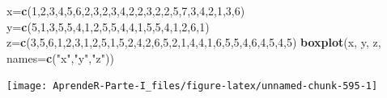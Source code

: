 \documentclass[]{book}
\newenvironment{Shaded}{\begin{snugshade}}{\end{snugshade}}
\newcommand{\DataTypeTok}[1]{\textcolor[rgb]{0.13,0.29,0.53}{#1}}
\newcommand{\DecValTok}[1]{\textcolor[rgb]{0.00,0.00,0.81}{#1}}
\newcommand{\KeywordTok}[1]{\textcolor[rgb]{0.13,0.29,0.53}{\textbf{#1}}}
\newcommand{\NormalTok}[1]{#1}
\newcommand{\StringTok}[1]{\textcolor[rgb]{0.31,0.60,0.02}{#1}}
\theoremstyle{definition}
\theoremstyle{definition}
\theoremstyle{definition}
\theoremstyle{remark}
\begin{document}
\begin{Shaded}
\begin{Highlighting}[]
\NormalTok{x=}\KeywordTok{c}\NormalTok{(}\DecValTok{1}\NormalTok{,}\DecValTok{2}\NormalTok{,}\DecValTok{3}\NormalTok{,}\DecValTok{4}\NormalTok{,}\DecValTok{5}\NormalTok{,}\DecValTok{6}\NormalTok{,}\DecValTok{2}\NormalTok{,}\DecValTok{3}\NormalTok{,}\DecValTok{2}\NormalTok{,}\DecValTok{3}\NormalTok{,}\DecValTok{4}\NormalTok{,}\DecValTok{2}\NormalTok{,}\DecValTok{2}\NormalTok{,}\DecValTok{3}\NormalTok{,}\DecValTok{2}\NormalTok{,}\DecValTok{2}\NormalTok{,}\DecValTok{5}\NormalTok{,}\DecValTok{7}\NormalTok{,}\DecValTok{3}\NormalTok{,}\DecValTok{4}\NormalTok{,}\DecValTok{2}\NormalTok{,}\DecValTok{1}\NormalTok{,}\DecValTok{3}\NormalTok{,}\DecValTok{6}\NormalTok{)}
\NormalTok{y=}\KeywordTok{c}\NormalTok{(}\DecValTok{5}\NormalTok{,}\DecValTok{1}\NormalTok{,}\DecValTok{3}\NormalTok{,}\DecValTok{5}\NormalTok{,}\DecValTok{5}\NormalTok{,}\DecValTok{4}\NormalTok{,}\DecValTok{1}\NormalTok{,}\DecValTok{2}\NormalTok{,}\DecValTok{5}\NormalTok{,}\DecValTok{5}\NormalTok{,}\DecValTok{4}\NormalTok{,}\DecValTok{4}\NormalTok{,}\DecValTok{1}\NormalTok{,}\DecValTok{5}\NormalTok{,}\DecValTok{5}\NormalTok{,}\DecValTok{4}\NormalTok{,}\DecValTok{1}\NormalTok{,}\DecValTok{2}\NormalTok{,}\DecValTok{6}\NormalTok{,}\DecValTok{1}\NormalTok{)}
\NormalTok{z=}\KeywordTok{c}\NormalTok{(}\DecValTok{3}\NormalTok{,}\DecValTok{5}\NormalTok{,}\DecValTok{6}\NormalTok{,}\DecValTok{1}\NormalTok{,}\DecValTok{2}\NormalTok{,}\DecValTok{3}\NormalTok{,}\DecValTok{1}\NormalTok{,}\DecValTok{2}\NormalTok{,}\DecValTok{5}\NormalTok{,}\DecValTok{1}\NormalTok{,}\DecValTok{5}\NormalTok{,}\DecValTok{2}\NormalTok{,}\DecValTok{4}\NormalTok{,}\DecValTok{2}\NormalTok{,}\DecValTok{6}\NormalTok{,}\DecValTok{5}\NormalTok{,}\DecValTok{2}\NormalTok{,}\DecValTok{1}\NormalTok{,}\DecValTok{4}\NormalTok{,}\DecValTok{4}\NormalTok{,}\DecValTok{1}\NormalTok{,}\DecValTok{6}\NormalTok{,}\DecValTok{5}\NormalTok{,}\DecValTok{5}\NormalTok{,}\DecValTok{4}\NormalTok{,}\DecValTok{6}\NormalTok{,}\DecValTok{4}\NormalTok{,}\DecValTok{5}\NormalTok{,}\DecValTok{4}\NormalTok{,}\DecValTok{5}\NormalTok{)}
\KeywordTok{boxplot}\NormalTok{(x, y, z, }\DataTypeTok{names=}\KeywordTok{c}\NormalTok{(}\StringTok{"x"}\NormalTok{,}\StringTok{"y"}\NormalTok{,}\StringTok{"z"}\NormalTok{))}
\end{Highlighting}
\end{Shaded}

\begin{center}\texttt{[image: AprendeR-Parte-I\_files/figure-latex/unnamed-chunk-595-1]} \end{center}
\end{document}
